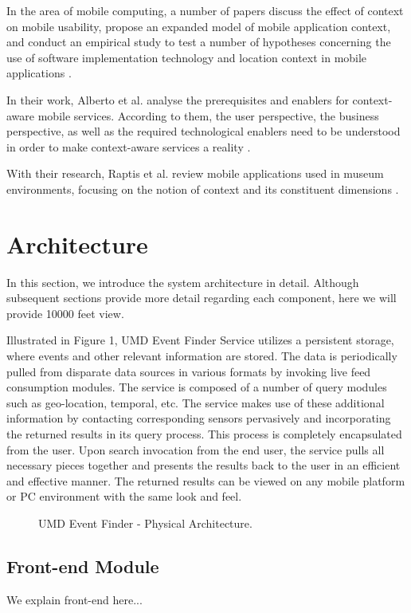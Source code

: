 \documentclass{acm_proc_article-sp}
\begin{document}
In the area of mobile computing, a number of papers discuss the effect of context on mobile usability, propose an expanded model of mobile application context, and conduct an empirical study to test a number of hypotheses concerning the use of software implementation technology and location context in mobile applications \cite{ryan:mobile}.

In their work, Alberto et al. analyse the prerequisites and enablers for context-aware mobile services. According to them,  the user perspective, the business perspective, as well as the required technological enablers need to be understood in order to make context-aware services a reality \cite{alberto:usercentric}.

With their research, Raptis et al. review mobile applications used in museum environments, focusing on the notion of context and its constituent dimensions \cite{raptis:museum}.

\section{Architecture}
In this section, we introduce the system architecture in detail. Although subsequent sections provide more detail regarding each component, here we will provide 10000 feet view.

Illustrated in Figure 1, UMD Event Finder Service utilizes a persistent storage, where events and other relevant information are stored. The data is periodically pulled from disparate data sources in various formats by invoking live feed consumption modules. The service is composed of a number of query modules such as geo-location, temporal, etc. The service makes use of these additional information by contacting corresponding sensors pervasively and incorporating the returned results in its query process. This process is completely encapsulated from the user. Upon search invocation from the end user, the service pulls all necessary pieces together and presents the results back to the user in an efficient and effective manner. The returned results can be viewed on any mobile platform or PC environment with the same look and feel.

\begin{figure*}
\centering
{}
\caption{UMD Event Finder - Physical Architecture.}
\end{figure*}

\subsection{Front-end Module}	 
\label{frontEnd}
We explain front-end here...
\end{document}
